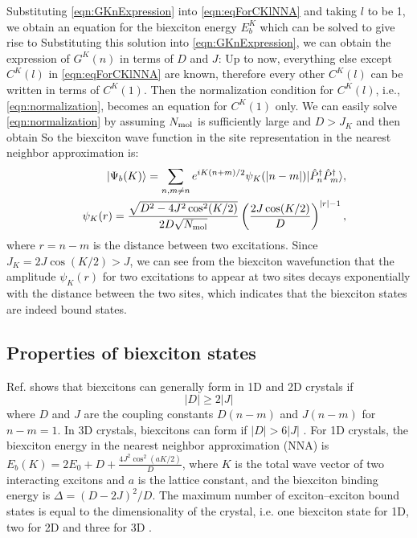 Substituting \autoref{eqn:GKnExpression} into \autoref{eqn:eqForCKlNNA} and taking $l$ to be 1, we obtain an 
equation for the biexciton energy $E^{K}_{b}$ which can be solved to give rise to
Substituting this solution into \autoref{eqn:GKnExpression}, we can obtain the expression of $G^{K}(n)$ in terms of
$D$ and $J$:
Up to now, everything else except $C^{K}(l)$ in \autoref{eqn:eqForCKlNNA} are known, therefore every other
 $C^{K}(l)$ can be written in terms of $C^{K}(1)$. Then the normalization condition for $C^{K}(l)$, i.e., 
 \autoref{eqn:normalization}, becomes an equation for $C^{K}(1)$ only. We can easily solve
 \autoref{eqn:normalization} by assuming $N_{\rm mol}$ is sufficiently large and $D > J_{K}$ and then obtain
So the biexciton wave function in the site representation in the nearest neighbor approximation is:
\begin{eqnarray}
&&| \Psi_b(K) \rangle = \sum\limits_{n,m \neq n} e^{iK(n+m)/2}
\psi_{K}(|n-m|) | \hat P_n^\dag \hat P_m^\dag \rangle , \nonumber \\
&&\psi_{K}(r) = \frac{\sqrt{D^2 - 4 J^2\cos^2 (K/2)}}{2D \sqrt{N_{\rm  mol}}} \left(
\frac{2 J\cos(K/2)}{D} \right)^{|r|-1} , \label{eqn:biexcitonWavefunction}
\end{eqnarray}
where $r=n-m$ is the distance between two excitations. Since $J_{K} = 2 J \cos(K/2) > J$, we can see from the 
biexciton wavefunction that the amplitude $\psi_{K}(r)$ for two excitations to appear at two sites decays 
exponentially with the distance between the two sites, which
 indicates that the biexciton states are indeed bound states. 


\subsection{Properties of biexciton states}
\label{sec:propertiesBiexciton}

Ref. \cite{vektaris} shows that biexcitons can generally form in 1D and 2D crystals if
\begin{equation}\label{biexc-formation}
|D| \geq 2 |J|
\end{equation}
where $D$ and $J$ are the coupling constants $D(n-m)$ and $J(n-m)$ for $n-m =1$. In 3D crystals, biexcitons can form
 if $|D| > 6 |J|$ \cite{biexciton-theory-2}. For 1D crystals, the biexciton energy in the nearest neighbor approximation
 (NNA) is $E_b(K) = 2E_0 + D + \frac{4 J^2 \cos^2(aK/2)}{D}$, where $K$ is the total wave vector of two interacting
 excitons and $a$ is the lattice constant, and the biexciton binding energy is $\Delta = (D - 2J)^2/D$. The maximum
 number of exciton--exciton bound states is equal to the dimensionality of the crystal, i.e. one biexciton state for 1D,
 two for 2D and three for 3D \cite{vektaris,note1}. 

